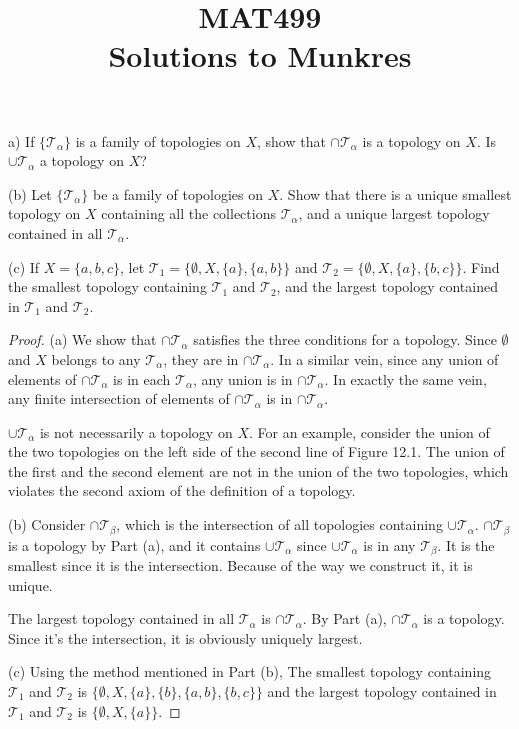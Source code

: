\documentclass[12pt]{article}
\title{MAT499\\Solutions to Munkres}
\author{\makebox[.9\textwidth]{Hongyuan}}
\newenvironment{problem}[2][Problem]
{
	\begin{trivlist} 
		\item[\hskip \labelsep {\bfseries #1 #2:}]
	}
{
	\end{trivlist}
	}
\begin{document}
\maketitle
\newpage
%
%
%
%
\newpage
\begin{problem}{13.4}
(a) If $\{\mathcal{T}_\alpha \}$ is a family of topologies on $X$, show that $\cap \mathcal{T}_\alpha$ is a topology on $X$. Is $\cup \mathcal{T}_\alpha$ a topology on $X$?

(b) Let $\{\mathcal{T}_\alpha \}$ be a family of topologies on $X$. Show that there is a unique smallest topology on $X$ containing all the collections $\mathcal{T}_\alpha$, and a unique largest topology contained in all $\mathcal{T}_\alpha$.

(c) If $X = \{a, b, c\}$, let $\mathcal{T}_{1} = \{ \emptyset, X, \{a\}, \{a, b\} \}$ and $\mathcal{T}_{2} = \{ \emptyset, X, \{a\}, \{b, c\} \}$. Find the smallest topology containing $\mathcal{T}_{1}$ and $\mathcal{T}_{2}$, and the largest topology contained in $\mathcal{T}_{1}$ and $\mathcal{T}_{2}$.
\end{problem}
%
\begin{proof}
(a) We show that $\cap \mathcal{T}_\alpha$ satisfies the three conditions for a topology. Since $\emptyset$ and $X$ belongs to any $\mathcal{T}_\alpha$, they are in $\cap \mathcal{T}_\alpha$. In a similar vein, since any union of elements of $\cap \mathcal{T}_\alpha$ is in each $\mathcal{T}_\alpha$, any union is in $\cap \mathcal{T}_\alpha$. In exactly the same vein, any finite intersection of elements of $\cap \mathcal{T}_\alpha$ is in $\cap \mathcal{T}_\alpha$. 

$\cup \mathcal{T}_\alpha$ is not necessarily a topology on $X$. For an example, consider the union of the two topologies on the left side of the second line of Figure 12.1. The union of the first and the second element are not in the union of the two topologies, which violates the second axiom of the definition of a topology.

(b) Consider $\cap \mathcal{T}_\beta$, which is the intersection of all topologies containing $\cup \mathcal{T}_\alpha$. $\cap \mathcal{T}_\beta$ is a topology by Part (a), and it contains $\cup \mathcal{T}_\alpha$ since $\cup \mathcal{T}_\alpha$ is in any $\mathcal{T}_\beta$. It is the smallest since it is the intersection. Because of the way we construct it, it is unique.

The largest topology contained in all $\mathcal{T}_\alpha$ is $\cap \mathcal{T}_\alpha$. By Part (a), $\cap \mathcal{T}_\alpha$ is a topology. Since it's the intersection, it is obviously uniquely largest.

(c) Using the method mentioned in Part (b), The smallest topology containing $\mathcal{T}_{1}$ and $\mathcal{T}_{2}$ is $\{\emptyset, X, \{a\}, \{b\}, \{a, b\}, \{b, c\} \}$ and the largest topology contained in $\mathcal{T}_{1}$ and $\mathcal{T}_{2}$ is $\{\emptyset, X, \{a\} \}$. 
\end{proof}
\end{document}
